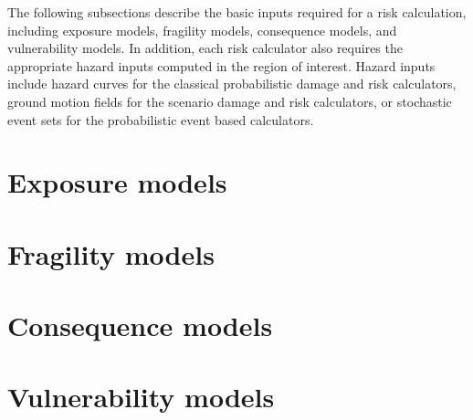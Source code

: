 The following subsections describe the basic inputs required for a risk
calculation, including exposure models, fragility models, consequence models,
and vulnerability models. In addition, each risk calculator also requires the
appropriate hazard inputs computed in the region of interest. Hazard inputs
include hazard curves for the classical probabilistic damage and risk
calculators, ground motion fields for the scenario damage and risk
calculators, or stochastic event sets for the probabilistic event based
calculators.


\section{Exposure models}
\label{sec:exposure}


\section{Fragility models}
\label{sec:fragility}


\section{Consequence models}
\label{sec:consequence}


\section{Vulnerability models}
\label{sec:vulnerability}
